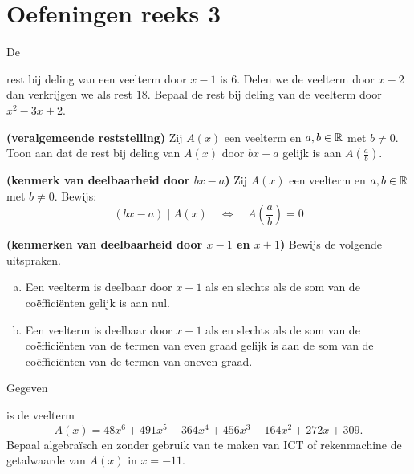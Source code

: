 \documentclass{ximera}
\begin{document}
\section*{Oefeningen reeks 3}

\begin{exercise} 
\hypertarget{oef3.16}{De} rest bij deling van een veelterm door $x-1$ is $6$. Delen we de veelterm door $x-2$ dan verkrijgen we als rest $18$. Bepaal de rest bij deling van de veelterm door $x^2-3x+2$. %
\end{exercise} 

\begin{Uitbreiding}
\begin{exercise} 
{\bf (veralgemeende reststelling)}
Zij $A(x)$ een veelterm en $a,b \in \mathbb{R}$ met $b \neq 0$. Toon aan dat de rest bij deling van $A(x)$ door $bx-a$ gelijk is aan $A\left(\frac{a}{b}\right)$.
\end{exercise} 

\begin{exercise} 
{\bf (kenmerk van deelbaarheid door $bx-a$)}
Zij $A(x)$ een veelterm en $a,b \in \mathbb{R}$ met $b \neq 0$. Bewijs:
\[
(bx-a) \mid A(x) \quad \Leftrightarrow \quad A\left(\frac{a}{b}\right) = 0
\]
\end{exercise} 

\begin{exercise} 
{\bf (kenmerken van deelbaarheid door $x-1$ en $x+1$)}
Bewijs de volgende uitspraken.
\begin{enumerate}[(a)]
\item
Een veelterm is deelbaar door $x-1$ als en slechts als de som van de co\"effici\"enten gelijk is aan nul.
\item
Een veelterm is deelbaar door $x+1$ als en slechts als de som van de co\"effici\"enten van de termen van even graad gelijk is aan de som van de co\"effici\"enten van de termen van oneven graad.
\end{enumerate}
\end{exercise} 
\end{Uitbreiding}

\begin{exercise} 
\hypertarget{oef3.20}{Gegeven} is de veelterm
\[
A(x) = 48x^6 + 491 x^5 - 364x^4 + 456x^3 - 164x^2 + 272x + 309.
\]
Bepaal algebra\"isch en zonder gebruik van te maken van ICT of rekenmachine de getalwaarde van $A(x)$ in $x = -11$. 
\end{exercise} 
\end{document}
